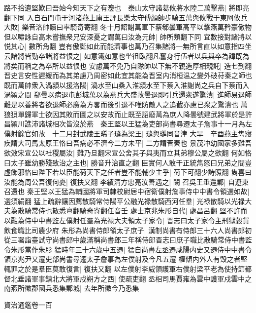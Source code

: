 路不拾遺堅歎曰吾始今知天下之有灋也　泰山太守諸葛攸將水陸二萬擊燕|{
	將即亮翻下同}
入自石門屯于河渚燕上庸王評長樂太守傅顔帥步騎五萬與攸戰于東阿攸兵大敗|{
	樂音洛帥讀曰率騎奇寄翻}
冬十月詔謝萬軍下蔡郗曇軍高平以擊燕萬矜豪傲物但以嘯詠自高未嘗撫衆兄安深憂之謂萬曰汝為元帥|{
	帥所類翻下同}
宜數接對諸將以悦其心|{
	數所角翻}
豈有傲誕如此而能濟事也萬乃召集諸將一無所言直以如意指四坐云諸將皆勁卒諸將益恨之|{
	如意鐵如意也坐徂臥翻凡奮身行伍者以兵與卒為諱既為將矣而稱之為卒所以益恨也}
安慮萬不免乃自隊帥以下無不親造厚相親託|{
	造七到翻晋史言安性遲緩而為其弟慮乃周密如此宜其能為晋室内消桓温之變外破苻秦之師也}
既而萬帥衆入渦潁以援洛陽|{
	渦水至山桑入淮潁水至下蔡入淮謝尚之兵自下蔡而入渦潁之間}
郗曇以病退屯彭城萬以為燕兵大盛故曇退即引兵還衆遂驚潰|{
	進師易退師難是以善將者欲退師必廣為方畧而後引退不唯防敵人之追截亦慮已衆之驚潰也}
萬狼狽單歸軍士欲因其敗而圖之以安故而止既至詔廢萬為庶人降曇號建武將軍於是許昌潁川譙沛諸城相次皆沒於燕　秦王堅以王猛為吏部尚書尋遷太子詹事十一月為左僕射餘官如故　十二月封武陵王晞子㻱為梁王|{
	㻱與璡同音津}
大旱　辛酉燕主雋寢疾謂大司馬太原王恪曰吾病必不濟今二方未平|{
	二方謂晋秦也}
景茂冲幼國家多難吾欲效宋宣公以社稷屬汝|{
	難乃旦翻宋宣公舍其子與夷而立其弟穆公屬之欲翻}
何如恪曰太子雖幼勝殘致治之主也|{
	勝音升治直之翻}
臣實何人敢干正統雋怒曰兄弟之間豈虛飾邪恪曰陛下若以臣能荷天下之任者豈不能輔少主乎|{
	荷下可翻少詩照翻}
雋喜曰汝能為周公吾復何憂|{
	復扶又翻}
李績清方忠亮汝善遇之|{
	闕}
召吳王垂還鄴|{
	自遼東召還也}
秦王堅以王猛為輔國將軍司隸校尉居中宿衛僕射詹事侍中中書令領選如故|{
	選須絹翻}
猛上疏辭讓因薦散騎常侍陽平公融光禄散騎西河任羣|{
	光禄散騎以光禄大夫為散騎常侍也散悉亶翻騎奇寄翻任音壬}
處士京兆朱彤自代|{
	處昌呂翻}
堅不許而以融為侍中中書監左僕射任羣為光禄大夫領太子家令|{
	晋志曰太子家令主刑獄穀貨飲食職比司農少府}
朱彤為尚書侍郎領太子庶子|{
	漢制尚書有侍郎三十六人尚書郎初從三署詣臺試守尚書郎中歲滿稱尚書郎三年稱侍郎晋志曰庶子職比散騎常侍中書監令朱彤當作朱肜}
猛時年三十六歲中五遷|{
	猛自尚書左丞遷咸陽内史又遷侍中中書令領京兆尹又遷吏部尚書尋遷太子詹事為左僕射及今凡五遷}
權傾内外人有毁之者堅輒罪之於是羣臣莫敢復言|{
	復扶又翻}
以左僕射李威領護軍右僕射梁平老為使持節都督北垂諸軍事鎮北大將軍戍朔方之西|{
	使疏吏翻}
丞相司馬賈雍為雲中護軍戍雲中之南燕所徵郡國兵悉集鄴城|{
	去年所徵今乃悉集}


資治通鑑卷一百
